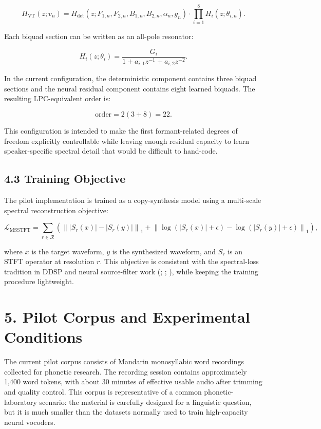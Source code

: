 \[
H_{\mathrm{VT}}(z; v_n)
=
H_{\mathrm{det}}(z; F_{1,n}, F_{2,n}, B_{1,n}, B_{2,n}, \alpha_n, g_n)
\cdot
\prod_{i=1}^{8} H_i(z; \theta_{i,n}).
\]

Each biquad section can be written as an all-pole resonator:

\[
H_i(z; \theta_i)
=
\frac{G_i}{1+a_{i,1}z^{-1}+a_{i,2}z^{-2}}.
\]

In the current configuration, the deterministic component contains three
biquad sections and the neural residual component contains eight learned
biquads. The resulting LPC-equivalent order is:

\[
\mathrm{order} = 2(3+8)=22.
\]

This configuration is intended to make the first formant-related degrees
of freedom explicitly controllable while leaving enough residual
capacity to learn speaker-specific spectral detail that would be
difficult to hand-code.

\subsection{4.3 Training Objective}\label{training-objective}

The pilot implementation is trained as a copy-synthesis model using a
multi-scale spectral reconstruction objective:

\[
\mathcal{L}_{\mathrm{MSSTFT}}
=
\sum_{r\in\mathcal{R}}
\left(
\left\| |S_r(x)|-|S_r(y)| \right\|_1
+
\left\| \log(|S_r(x)|+\epsilon)-\log(|S_r(y)|+\epsilon) \right\|_1
\right),
\]

where \(x\) is the target waveform, \(y\) is the synthesized waveform,
and \(S_r\) is an STFT operator at resolution \(r\). This objective is
consistent with the spectral-loss tradition in DDSP and neural
source-filter work (;
;
), while keeping the
training procedure lightweight.

\section{5. Pilot Corpus and Experimental
Conditions}\label{pilot-corpus-and-experimental-conditions}

The current pilot corpus consists of Mandarin monosyllabic word
recordings collected for phonetic research. The recording session
contains approximately 1,400 word tokens, with about 30 minutes of
effective usable audio after trimming and quality control. This corpus
is representative of a common phonetic-laboratory scenario: the material
is carefully designed for a linguistic question, but it is much smaller
than the datasets normally used to train high-capacity neural vocoders.

